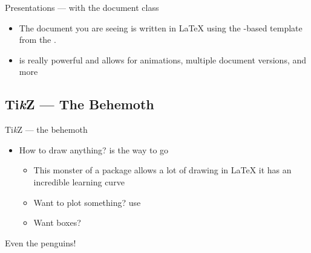 \begin{frame}{Presentations --- with the \BeamerCls document class}
   \begin{itemize}
      \item The document you are seeing is written in \LaTeX{} using the \BeamerCls-based template from the .
      \item \BeamerCls is really powerful and allows for animations, multiple document versions, and more\medskip
   \end{itemize}
\end{frame}

\subsection{Ti\textit{k}Z --- The Behemoth}


\begin{frame}{Ti\textit{k}Z --- the behemoth}
   \begin{itemize}
      \item How to draw anything? \TikzPkg is the way to go \begin{itemize}
         \item This monster of a package allows a lot of drawing in \LaTeX{} it has an incredible learning curve
         \item Want to plot something? use \PgfplotsPkg
         \item Want boxes? \TcolorboxPkg
      \end{itemize}
   \end{itemize}
\end{frame}

\begin{frame}{Even the penguins!}

\end{frame}

